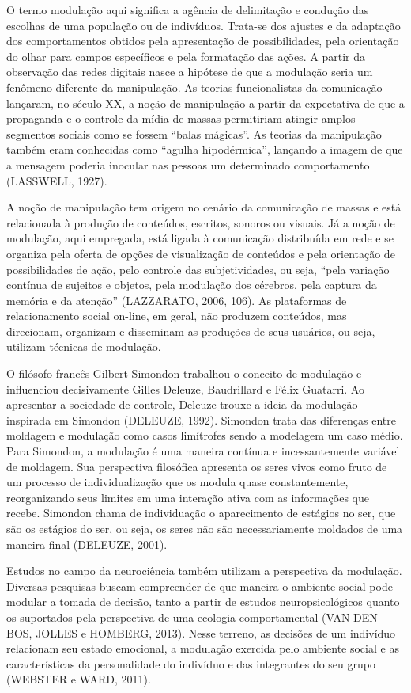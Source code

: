 O termo modulação aqui significa a agência de delimitação e condução das
escolhas de uma população ou de indivíduos. Trata-se dos ajustes e da
adaptação dos comportamentos obtidos pela apresentação de
possibilidades, pela orientação do olhar para campos específicos e pela
formatação das ações. A partir da observação das redes digitais nasce a
hipótese de que a modulação seria um fenômeno diferente da manipulação.
As teorias funcionalistas da comunicação lançaram, no século XX, a noção
de manipulação a partir da expectativa de que a propaganda e o controle
da mídia de massas permitiriam atingir amplos segmentos sociais como se
fossem ``balas mágicas''. As teorias da manipulação também eram
conhecidas como ``agulha hipodérmica'', lançando a imagem de que a
mensagem poderia inocular nas pessoas um determinado comportamento
(LASSWELL, 1927).

A noção de manipulação tem origem no cenário da comunicação de massas e
está relacionada à produção de conteúdos, escritos, sonoros ou visuais.
Já a noção de modulação, aqui empregada, está ligada à comunicação
distribuída em rede e se organiza pela oferta de opções de visualização
de conteúdos e pela orientação de possibilidades de ação, pelo controle
das subjetividades, ou seja, ``pela variação contínua de sujeitos e
objetos, pela modulação dos cérebros, pela captura da memória e da
atenção'' (LAZZARATO, 2006, 106). As plataformas de relacionamento
social on-line, em geral, não produzem conteúdos, mas direcionam,
organizam e disseminam as produções de seus usuários, ou seja, utilizam
técnicas de modulação.

O filósofo francês Gilbert Simondon trabalhou o conceito de modulação e
influenciou decisivamente Gilles Deleuze, Baudrillard e Félix Guatarri.
Ao apresentar a sociedade de controle, Deleuze trouxe a ideia da
modulação inspirada em Simondon (DELEUZE, 1992). Simondon trata das
diferenças entre moldagem e modulação como casos limítrofes sendo a
modelagem um caso médio. Para Simondon, a modulação é uma maneira
contínua e incessantemente variável de moldagem. Sua perspectiva
filosófica apresenta os seres vivos como fruto de um processo de
individualização que os modula quase constantemente, reorganizando seus
limites em uma interação ativa com as informações que recebe. Simondon
chama de individuação o aparecimento de estágios no ser, que são os
estágios do ser, ou seja, os seres não são necessariamente moldados de
uma maneira final (DELEUZE, 2001).

Estudos no campo da neurociência também utilizam a perspectiva da
modulação. Diversas pesquisas buscam compreender de que maneira o
ambiente social pode modular a tomada de decisão, tanto a partir de
estudos neuropsicológicos quanto os suportados pela perspectiva de uma
ecologia comportamental (VAN DEN BOS, JOLLES e HOMBERG, 2013). Nesse
terreno, as decisões de um indivíduo relacionam seu estado emocional, a
modulação exercida pelo ambiente social e as características da
personalidade do indivíduo e das integrantes do seu grupo (WEBSTER e
WARD, 2011).

